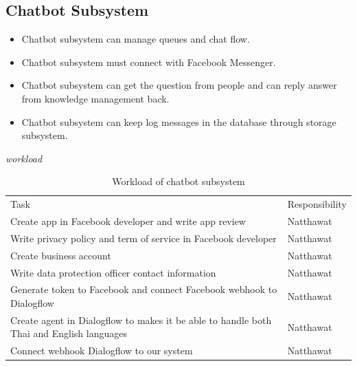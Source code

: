 \documentclass[12pt,oneside,openright,a4paper]{cpe-english-project}
\begin{document}
	\subsection{Chatbot Subsystem}
	\begin{itemize}
		\item Chatbot subsystem can manage queues and chat flow.
		\item Chatbot subsystem must connect with Facebook Messenger.
		\item Chatbot subsystem can get the question from people and can reply answer from knowledge management back.
		\item Chatbot subsystem can keep log messages in the database through storage subsystem.
	\end{itemize}
\emph{workload}
\begin{table}[h]
	\centering
	\caption{Workload of chatbot subsystem}
	\label{tab:Workload of chatbot subsystem}
\begin{adjustbox}{width=\textwidth}
\begin{tabular}{ll}
		\rowcolor[HTML]{5B9BD5} 
		Task                                                                                       & Responsibility \\
		\rowcolor[HTML]{DEEAF6} 
		Create app in Facebook developer and write app review                                      & Natthawat      \\
		Write privacy policy and term of service in   Facebook developer                           & Natthawat      \\
		\rowcolor[HTML]{DEEAF6} 
		Create business account                                                                    & Natthawat      \\
		Write data protection officer contact   information                                        & Natthawat      \\
		\rowcolor[HTML]{DEEAF6} 
		Generate token to Facebook and connect Facebook   webhook to Dialogflow                    & Natthawat      \\
		Create agent in Dialogflow to makes it be able   to handle both Thai and English languages & Natthawat      \\
		\rowcolor[HTML]{DEEAF6} 
		Connect webhook Dialogflow to our system                                                   & Natthawat      
	\end{tabular}
\end{adjustbox}
\end{table}
\end{document}
